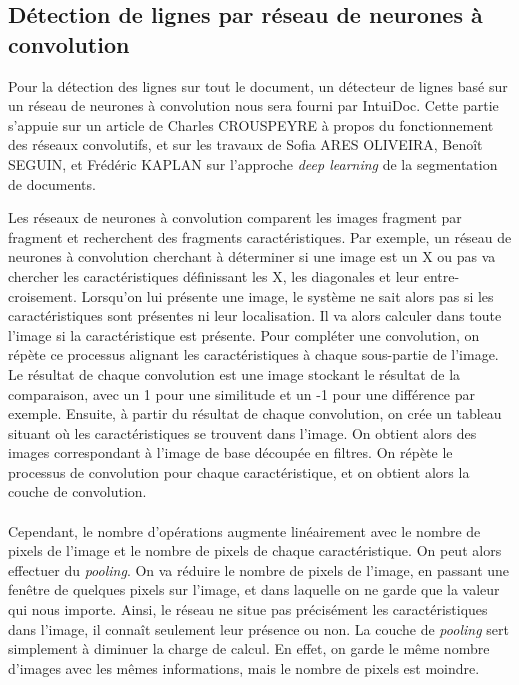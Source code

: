 \subsection{Détection de lignes par réseau de neurones à convolution}

Pour la détection des lignes sur tout le document, un détecteur de lignes basé sur un réseau de neurones à convolution nous sera
fourni par IntuiDoc. Cette partie s'appuie sur un article\cite{crouspeyre:2017} de Charles CROUSPEYRE à propos du fonctionnement des
réseaux convolutifs, et sur les travaux de Sofia ARES OLIVEIRA, Benoît SEGUIN, et Frédéric KAPLAN\cite{dhsegment:2018} sur l’approche
\textit{deep learning} de la segmentation de documents. 

Les réseaux de neurones à convolution comparent les images fragment par fragment et recherchent des fragments caractéristiques.
Par exemple, un réseau de neurones à convolution cherchant à déterminer si une image est un X ou pas va chercher les caractéristiques
définissant les X, les diagonales et leur entre-croisement. Lorsqu'on lui présente une image, le système ne sait alors pas si les
caractéristiques sont présentes ni leur localisation. Il va alors calculer dans toute l'image si la caractéristique est présente.
Pour compléter une convolution, on répète ce processus alignant les caractéristiques à chaque sous-partie de l'image.
Le résultat de chaque convolution est une image stockant le résultat de la comparaison, avec un 1 pour une similitude et un -1
pour une différence par exemple. Ensuite, à partir du résultat de chaque convolution, on crée un tableau situant où les
caractéristiques se trouvent dans l'image. On obtient alors des images correspondant à l'image de base découpée en filtres.
On répète le processus de convolution pour chaque caractéristique, et on obtient alors la couche de convolution.

\paragraph{}
Cependant, le nombre d'opérations augmente linéairement avec le nombre de pixels de l'image et le
nombre de pixels de chaque caractéristique. On peut alors effectuer du \textit{pooling}. On va
réduire le nombre de pixels de l'image, en passant une fenêtre de quelques pixels sur l'image,
et dans laquelle on ne garde que la valeur qui nous importe. Ainsi, le réseau ne situe pas précisément
les caractéristiques dans l'image, il connaît seulement leur présence ou non. La couche de
\textit{pooling} sert simplement à diminuer la charge de calcul. En effet, on garde le même nombre
d'images avec les mêmes informations, mais le nombre de pixels est moindre.

